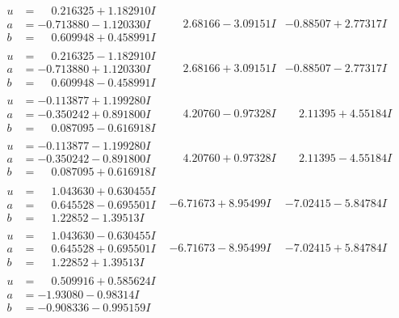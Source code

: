 \documentclass[1p]{elsarticle_modified}
\theoremstyle{definition}
\begin{document}
$$\begin{array}{c|c|c}
\begin{aligned}
u &= \phantom{-}0.216325 + 1.182910 I \\
a &= -0.713880 - 1.120330 I \\
b &= \phantom{-}0.609948 + 0.458991 I\end{aligned}
 & \phantom{-}2.68166 - 3.09151 I & -0.88507 + 2.77317 I \\ \hline\begin{aligned}
u &= \phantom{-}0.216325 - 1.182910 I \\
a &= -0.713880 + 1.120330 I \\
b &= \phantom{-}0.609948 - 0.458991 I\end{aligned}
 & \phantom{-}2.68166 + 3.09151 I & -0.88507 - 2.77317 I \\ \hline\begin{aligned}
u &= -0.113877 + 1.199280 I \\
a &= -0.350242 + 0.891800 I \\
b &= \phantom{-}0.087095 - 0.616918 I\end{aligned}
 & \phantom{-}4.20760 - 0.97328 I & \phantom{-}2.11395 + 4.55184 I \\ \hline\begin{aligned}
u &= -0.113877 - 1.199280 I \\
a &= -0.350242 - 0.891800 I \\
b &= \phantom{-}0.087095 + 0.616918 I\end{aligned}
 & \phantom{-}4.20760 + 0.97328 I & \phantom{-}2.11395 - 4.55184 I \\ \hline\begin{aligned}
u &= \phantom{-}1.043630 + 0.630455 I \\
a &= \phantom{-}0.645528 - 0.695501 I \\
b &= \phantom{-}1.22852 - 1.39513 I\end{aligned}
 & -6.71673 + 8.95499 I & -7.02415 - 5.84784 I \\ \hline\begin{aligned}
u &= \phantom{-}1.043630 - 0.630455 I \\
a &= \phantom{-}0.645528 + 0.695501 I \\
b &= \phantom{-}1.22852 + 1.39513 I\end{aligned}
 & -6.71673 - 8.95499 I & -7.02415 + 5.84784 I \\ \hline\begin{aligned}
u &= \phantom{-}0.509916 + 0.585624 I \\
a &= -1.93080 - 0.98314 I \\
b &= -0.908336 - 0.995159 I\end{aligned}

\end{array}$$
\end{document}
